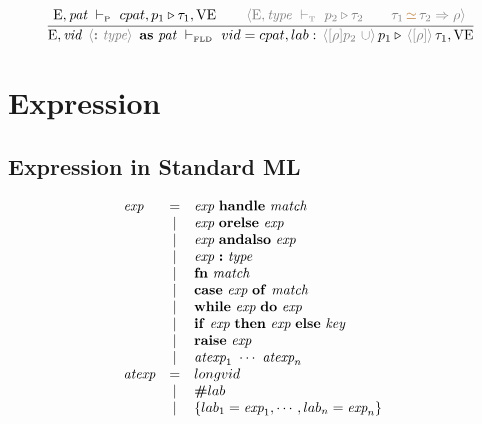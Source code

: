 \documentclass[11pt,a4paper]{article}
\newcommand{\key}[1]{\textrm{\textbf{#1}}}
\newcommand{\prodlhs}[1]{\textit{#1}}
\newcommand{\qualtype}[2]{#1 \triangleright #2}
\newcommand{\unify}[3]{#1\,{\color{brown}{\simeq}}\,#2 \Rightarrow #3}
\newcommand{\braced}[1]{\{#1\}}
\newcommand{\angled}[1]{\,{\color{gray}\langle#1\rangle}\,}
\newcommand{\Env}  {\textrm{E}}
\newcommand{\VE}   {\textrm{VE}}
\newcommand{\vdashP}  {\ \vdash_{\textrm{\tiny P}}\  }
\newcommand{\vdashT}  {\ \vdash_{\textrm{\tiny T}}\  }
\newcommand{\vdashFLD}{\ \vdash_\textrm{\tiny FLD}\  }
\begin{document}
\[
\cfrac
 {\Env,\prodlhs{pat}  \vdashP cpat,\qualtype{p_1}{\tau_1}, \VE      \qquad
  \angled{\Env,\prodlhs{type} \vdashT \qualtype{p_2}{\tau_2}        \qquad
  \unify{\tau_1}{\tau_2}{\rho}}}
 {\Env, \prodlhs{vid}\ \angled{\key{:}\ \prodlhs{type}}\ \key{as}\ \prodlhs{pat}  \vdashFLD 
    vid=cpat, lab:\qualtype{\angled{[\rho]p_2\ \cup} p_1}{\angled{[\rho]}\tau_1}, \VE }
\]

\section {Expression}
\subsection {Expression in Standard ML}
{\renewcommand{\arraystretch}{1.2}\[
\begin{array}{lcll}
\prodlhs{exp}
    & = & \prodlhs{exp}\ \key{handle}\ \prodlhs{match}                              &\\        
    & | & \prodlhs{exp}\ \key{orelse}\ \prodlhs{exp}                                &\\
    & | & \prodlhs{exp}\ \key{andalso}\ \prodlhs{exp}                               &\\
    & | & \prodlhs{exp}\ \key{:}\ \prodlhs{type}                                    &\\
    & | & \key{fn}\ \prodlhs{match}                                                 &\\
    & | & \key{case}\ \prodlhs{exp}\ \key{of}\ \prodlhs{match}                      &\\
    & | & \key{while}\ \prodlhs{exp}\ \key{do}\ \prodlhs{exp}                       &\\
    & | & \key{if}\ \prodlhs{exp}\ \key{then}\ \prodlhs{exp}\ \key{else}\ \prodlhs{key} &\\
    & | & \key{raise}\ \prodlhs{exp}                                                &\\
    & | & \prodlhs{atexp}_1\ \cdots\ \prodlhs{atexp}_n                              &\\
\prodlhs{atexp}
    & = & longvid                                                                   &\\
    & | & \key{\#}lab                                                               &\\
    & | & \braced{lab_1=\prodlhs{exp}_1,\cdots,lab_n=\prodlhs{exp}_n}               &\\

\end{array}\]}
\end{document}
